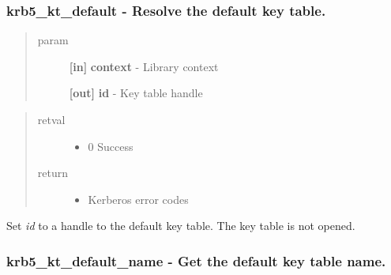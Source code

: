 \documentclass[letterpaper,10pt,english]{sphinxmanual}
\begin{document}
\subsubsection{krb5\_kt\_default -  Resolve the default key table.}
\label{appdev/refs/api/krb5_kt_default:krb5-kt-default-resolve-the-default-key-table}\label{appdev/refs/api/krb5_kt_default::doc}

\begin{fulllineitems}
\label{appdev/refs/api/krb5_kt_default:c.krb5_kt_default}
\end{fulllineitems}

\begin{quote}\begin{description}
\item[{param}] \leavevmode
\textbf{{[}in{]}} \textbf{context} - Library context

\textbf{{[}out{]}} \textbf{id} - Key table handle

\end{description}\end{quote}
\begin{quote}\begin{description}
\item[{retval}] \leavevmode\begin{itemize}
\item {} 
0   Success

\end{itemize}

\item[{return}] \leavevmode\begin{itemize}
\item {} 
Kerberos error codes

\end{itemize}

\end{description}\end{quote}

Set \emph{id} to a handle to the default key table. The key table is not opened.


\subsubsection{krb5\_kt\_default\_name -  Get the default key table name.}
\label{appdev/refs/api/krb5_kt_default_name::doc}\label{appdev/refs/api/krb5_kt_default_name:krb5-kt-default-name-get-the-default-key-table-name}
\end{document}
